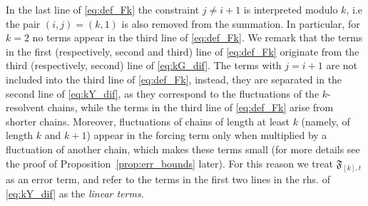 \documentclass[10pt]{amsart}
\numberwithin{equation}{section}
\begin{document}
In the last line of \eqref{eq:def_Fk} the constraint $j\neq i+1$ is interpreted modulo $k$, i.e the pair $(i,j)=(k,1)$ is also removed from the summation. In particular, for $k=2$ no terms appear in the third line of \eqref{eq:def_Fk}. We remark that the terms in the first (respectively, second and third) line of \eqref{eq:def_Fk} originate from the third (respectively, second) line of \eqref{eq:kG_dif}. The terms with $j=i+1$ are not included into the third line of \eqref{eq:def_Fk}, instead, they are separated in the second line of \eqref{eq:kY_dif}, as they correspond to the fluctuations of the $k$-resolvent chains, while the terms in the third line of \eqref{eq:def_Fk} arise from shorter chains. Moreover, fluctuations of chains of length at least $k$ (namely, of length $k$ and $k+1$) appear in the forcing term only when multiplied by a fluctuation of another chain, which makes these terms small (for more details see the proof of Proposition~\ref{prop:err_bounds} later). For this reason we treat $\mathfrak{F}_{[k],t}$ as an error term, and refer to the terms in the first two lines in the rhs. of \eqref{eq:kY_dif} as the \emph{linear terms}.
\end{document}
